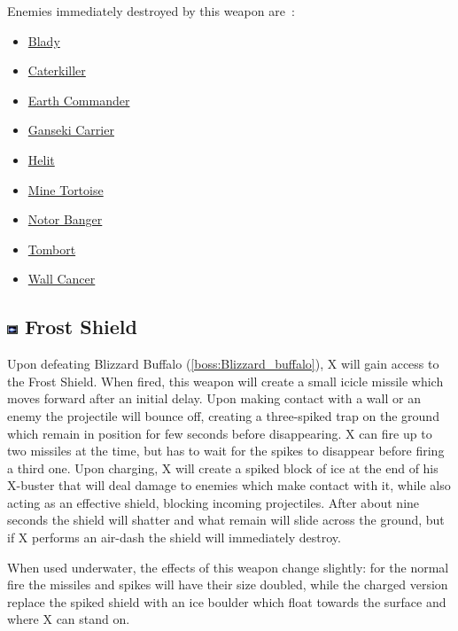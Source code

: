 Enemies immediately destroyed by this weapon are~\cite{wiki:damage_chart_X3}:
\begin{itemize}
	\item \hyperlink{enem:Blady}{Blady}
	\item \hyperlink{enem:Caterkiller}{Caterkiller}
	\item \hyperlink{enem:Earth_Commander}{Earth Commander}
	\item \hyperlink{enem:Ganseki_Carrier}{Ganseki Carrier}
	\item \hyperlink{enem:Helit}{Helit}
	\item \hyperlink{enem:Mine_Tortoise}{Mine Tortoise}
	\item \hyperlink{enem:Notor_Banger}{Notor Banger}
	\item \hyperlink{enem:Tombort}{Tombort}
	\item \hyperlink{enem:Wall_Cancer}{Wall Cancer}
\end{itemize}
\subsection{\includegraphics[width=12px, height=10px]{figures/X3/weapons/F_shield.jpg} Frost Shield}\label{Frost_Shield}
Upon defeating Blizzard Buffalo (\ref{boss:Blizzard_buffalo}), X will gain access to the Frost Shield. When fired, this weapon will create a small icicle missile which moves forward after an initial delay. Upon making contact with a wall or an enemy the projectile will bounce off, creating a three-spiked trap on the ground which remain in position for few seconds before disappearing. X can fire up to two missiles at the time, but has to wait for the spikes to disappear before firing a third one. Upon charging, X will create a spiked block of ice at the end of his X-buster that will deal damage to enemies which make contact with it, while also acting as an effective shield, blocking incoming projectiles. After about nine seconds the shield will shatter and what remain will slide across the ground, but if X performs an air-dash the shield will immediately destroy.

When used underwater, the effects of this weapon change slightly: for the normal fire the missiles and spikes will have their size doubled, while the charged version replace the spiked shield with an ice boulder which float towards the surface and where X can stand on.


